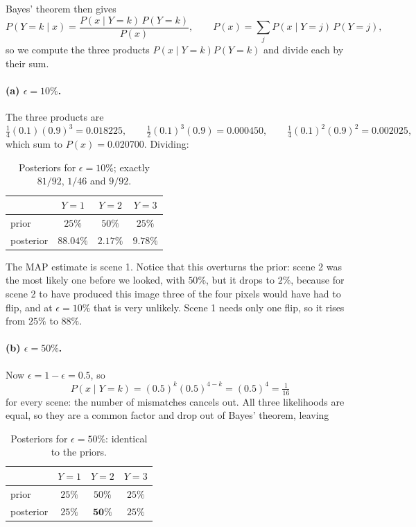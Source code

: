 \documentclass[11pt]{article}
\begin{document}
Bayes' theorem then gives
\[
    P(Y=k \mid x) = \frac{P(x \mid Y=k)\,P(Y=k)}{P(x)},
    \qquad
    P(x) = \sum_{j} P(x \mid Y=j)\,P(Y=j),
\]
so we compute the three products $P(x \mid Y=k) P(Y=k)$ and divide each by
their sum.

\paragraph{(a) $\epsilon = 10\%$.}
The three products are
\[
    \tfrac{1}{4}(0.1)(0.9)^3 = 0.018225,
    \qquad
    \tfrac{1}{2}(0.1)^3(0.9) = 0.000450,
    \qquad
    \tfrac{1}{4}(0.1)^2(0.9)^2 = 0.002025,
\]
which sum to $P(x) = 0.020700$. Dividing:

\begin{table}[H]
    \centering
    \begin{tabular}{lccc}
        \toprule
        & $Y=1$ & $Y=2$ & $Y=3$ \\
        \midrule
        prior & $25\%$ & $50\%$ & $25\%$ \\
        posterior & $\mathbf{88.04\%}$ & $2.17\%$ & $9.78\%$ \\
        \bottomrule
    \end{tabular}
    \caption{Posteriors for $\epsilon = 10\%$; exactly $81/92$, $1/46$ and
    $9/92$.}
\end{table}

The MAP estimate is scene 1. Notice that this overturns the prior: scene 2 was
the most likely one before we looked, with $50\%$, but it drops to $2\%$,
because for scene 2 to have produced this image three of the four pixels would
have had to flip, and at $\epsilon = 10\%$ that is very unlikely. Scene 1
needs only one flip, so it rises from $25\%$ to $88\%$.

\paragraph{(b) $\epsilon = 50\%$.}
Now $\epsilon = 1 - \epsilon = 0.5$, so
\[
    P(x \mid Y=k) = (0.5)^{k}(0.5)^{4-k} = (0.5)^4 = \tfrac{1}{16}
\]
for every scene: the number of mismatches cancels out. All three likelihoods
are equal, so they are a common factor and drop out of Bayes' theorem, leaving

\begin{table}[H]
    \centering
    \begin{tabular}{lccc}
        \toprule
        & $Y=1$ & $Y=2$ & $Y=3$ \\
        \midrule
        prior & $25\%$ & $50\%$ & $25\%$ \\
        posterior & $25\%$ & $\mathbf{50\%}$ & $25\%$ \\
        \bottomrule
    \end{tabular}
    \caption{Posteriors for $\epsilon = 50\%$: identical to the priors.}
\end{table}
\end{document}
